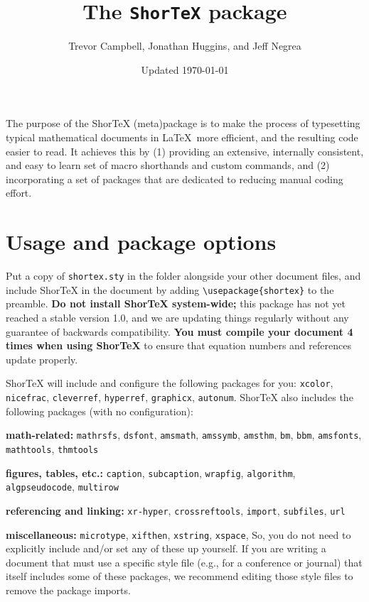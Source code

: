 \documentclass{article}
\title{The \texttt{ShorTeX} package}
\author{Trevor Campbell, Jonathan Huggins, and Jeff Negrea}
\date{Updated \today}
\begin{document}
\maketitle

\babs

The purpose of the ShorTeX (meta)package is to make the process of typesetting
typical mathematical documents in \LaTeX~more efficient, and the resulting
code easier to read.  It achieves this by 
(1) providing an
extensive, internally consistent, and easy to learn set of macro
shorthands and custom commands, and 
(2) incorporating a set of packages that are
dedicated to reducing manual coding effort.
\eabs


\tableofcontents

\section{Usage and package options}\label{sec:usage}

Put a copy of \texttt{shortex.sty} in the folder
alongside your other document files, and
include ShorTeX in the document by adding \verb!\usepackage{shortex}! to the preamble.
\textbf{Do not install ShorTeX system-wide;} this package has not yet reached a stable version 1.0,
and we are updating things regularly without any guarantee of backwards
compatibility. 
\textbf{You must compile your document 4 times when using ShorTeX} to ensure that equation
numbers and references update properly.

ShorTeX will include and configure the following packages for you:
\texttt{xcolor},
\texttt{nicefrac},
\texttt{cleverref},
\texttt{hyperref},
\texttt{graphicx},
\texttt{autonum}.
ShorTeX also includes the following packages (with no configuration):
\bitem 
\item \textbf{math-related:}  \texttt{mathrsfs}, \texttt{dsfont}, \texttt{amsmath}, \texttt{amssymb}, \texttt{amsthm}, \texttt{bm}, \texttt{bbm}, \texttt{amsfonts}, \texttt{mathtools}, \texttt{thmtools}
\item \textbf{figures, tables, etc.:}   \texttt{caption}, \texttt{subcaption}, \texttt{wrapfig}, \texttt{algorithm}, \linebreak \texttt{algpseudocode}, \texttt{multirow}
\item \textbf{referencing and linking:}  \texttt{xr-hyper}, \texttt{crossreftools}, \texttt{import}, \texttt{subfiles}, \texttt{url}
\item \textbf{miscellaneous:} \texttt{microtype}, \texttt{xifthen}, \texttt{xstring}, \texttt{xspace},
\eitem
So, you do not need to explicitly include and/or set any of these up yourself.
If you are writing a document that must use a specific style file (e.g., for a conference or journal) that itself
includes some of these packages, we recommend editing those style files to remove the package imports.
\end{document}
